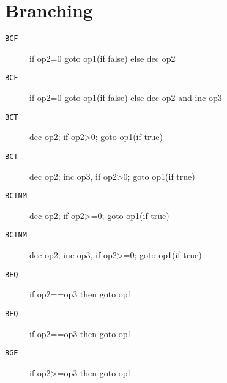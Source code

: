 \section{Branching}
\begin{description}
\item[\texttt{BCF}]  if op2=0 goto op1(if false) else dec op2\\

\end{description}
\begin{description}
\item[\texttt{BCF}]  if op2=0 goto op1(if false) else dec op2 and inc op3\\

\end{description}
\begin{description}
\item[\texttt{BCT}]  dec op2; if op2>0; goto op1(if true)\\

\end{description}
\begin{description}
\item[\texttt{BCT}]  dec op2; inc op3, if op2>0; goto op1(if true)\\

\end{description}
\begin{description}
\item[\texttt{BCTNM}]  dec op2; if op2>=0; goto op1(if true)\\

\end{description}
\begin{description}
\item[\texttt{BCTNM}]  dec op2; inc op3, if op2>=0; goto op1(if true)\\

\end{description}
\begin{description}
\item[\texttt{BEQ}]  if op2==op3 then goto op1\\

\end{description}
\begin{description}
\item[\texttt{BEQ}]  if op2==op3 then goto op1\\

\end{description}
\begin{description}
\item[\texttt{BGE}]  if op2>=op3 then goto op1\\

\end{description}
